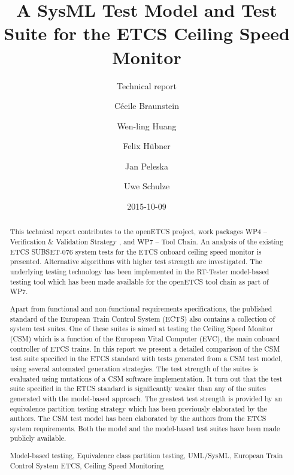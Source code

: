 \documentclass{template/openetcs_article}
\newcommand{\keywords}[1]{\par\addvspace\baselineskip
\noindent {\bf Keywords} \enspace\ignorespaces#1}
\begin{document}
\frontmatter
{}




\title{A {SysML} Test Model and Test Suite for the {ETCS} Ceiling Speed Monitor}

\subtitle{Technical report}

\date{2015-10-09}

 

\author{C\'{e}cile Braunstein \and Wen-ling Huang \and Felix H\"ubner \and Jan
  Peleska \and Uwe Schulze}
 
\begin{abstract}
This technical report contributes to the openETCS project, work packages 
WP4 -- Verification \& Validation Strategy , and WP7 -- Tool Chain. 
An analysis of the existing ETCS SUBSET-076 system tests for the ETCS onboard 
ceiling speed monitor is presented. Alternative algorithms  with higher test strength are
investigated. The underlying testing technology has been implemented in the RT-Tester
model-based testing tool which has been made available for the openETCS tool chain 
as part of WP7.

Apart from functional and non-functional 
requirements specifications, the published standard of the European Train Control System (ECTS) also contains a collection of system test suites. One of these suites is aimed at testing the Ceiling Speed Monitor (CSM) which is a function of the European Vital Computer (EVC), the main onboard controller of ETCS trains.
In this report we present a detailed comparison of   the CSM test suite specified in the ETCS standard with
tests generated from a CSM test model, using several automated generation strategies.  
The test strength of the suites is evaluated using mutations of a CSM software 
implementation.
It turn out that the test suite specified in the ETCS standard is significantly weaker than any of the suites generated with the model-based approach. The greatest test strength is provided by an equivalence partition testing strategy which has been previously elaborated by the authors. The CSM test model has been elaborated by the authors from the ETCS system requirements. Both the model and the model-based test suites have been made   publicly available.
\keywords{Model-based testing, Equivalence class partition testing, UML/SysML, European Train Control System ETCS, Ceiling Speed Monitoring}
\end{abstract}
\end{document}
